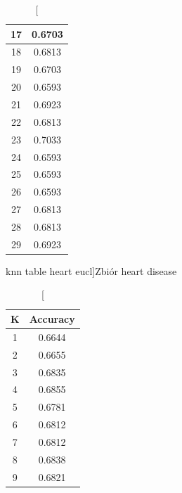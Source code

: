 \documentclass{classrep}
\begin{document}
{{{\begin{table}[!htbp]
\begin{minipage}{.35\textwidth}
\begin{tabular}{|c|c|}
                            17 & 0.6703 \\ \hline
                            18 & 0.6813 \\ \hline
                            19 & 0.6703 \\ \hline
                            20 & 0.6593 \\ \hline
                            21 & 0.6923 \\ \hline
                            22 & 0.6813 \\ \hline
                            23 & 0.7033 \\ \hline
                            24 & 0.6593 \\ \hline
                            25 & 0.6593 \\ \hline
                            26 & 0.6593 \\ \hline
                            27 & 0.6813 \\ \hline
                            28 & 0.6813 \\ \hline
                            29 & 0.6923 \\ \hline
                        \end{tabular}
                        \caption
                        [knn table heart eucl]{Zbiór heart disease}
                        \label{knn_table_heart_eucl}
                    \end{minipage}
                    \hfill
                    \begin{minipage}{.3\textwidth}
                        \centering
                        \begin{tabular}{|c|c|}
                            \hline
                            K & Accuracy \\ \hline
                            1 & 0.6644 \\ \hline
                            2 & 0.6655 \\ \hline
                            3 & 0.6835 \\ \hline
                            4 & 0.6855 \\ \hline
                            5 & 0.6781 \\ \hline
                            6 & 0.6812 \\ \hline
                            7 & 0.6812 \\ \hline
                            8 & 0.6838 \\ \hline
                            9 & 0.6821 \\ \hline

\end{tabular}
\end{minipage}
\end{table}}}}
\end{document}
